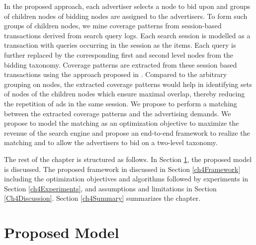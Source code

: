 In the proposed approach, each advertiser selects a node to bid upon and groups of children nodes of bidding nodes are assigned to the advertisers. To form such groups of children nodes, we mine coverage patterns from session-based transactions derived from search query logs. Each search session is modelled as a transaction with queries occurring in the session as the items. Each query is further replaced by the corresponding first and second level nodes from the bidding taxonomy. Coverage patterns are extracted from these session based transactions using the approach proposed in \cite{srinivas2014mining}. Compared to the arbitrary grouping on nodes, the extracted coverage patterns would help in identifying sets of nodes of the children nodes which ensure maximal overlap, thereby reducing the repetition of ads in the same session. We propose to perform a matching between the extracted coverage patterns and the advertising demands. We propose to model the matching as an optimization objective to maximize the revenue of the search engine and propose an end-to-end framework to realize the matching and to allow the advertisers to bid on a two-level taxonomy.



The rest of the chapter is structured as follows. In Section \ref{Ch4ProposedModel}, the proposed model is discussed. The proposed framework in discussed in Section \ref{ch4Framework} including the optimization objectives and algorithms followed by experiments in Section \ref{ch4Experiments}, and assumptions and limitations in Section \ref{Ch4Discussion}. Section \ref{ch4Summary} summarizes the chapter.

 

\section{Proposed Model}


\label{Ch4ProposedModel}



